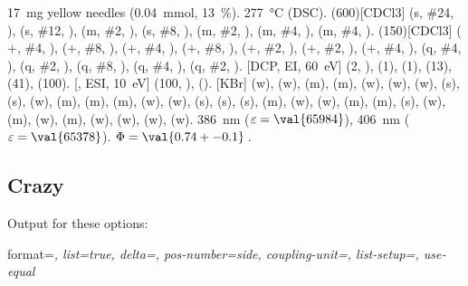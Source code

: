 \documentclass{chemmacros-manual}
\begin{document}
\begin{experimental}[format=\bfseries,delta=(ppm),list=true,use-equal]
   \SI{17}{\milli\gram} yellow needles (\SI{0.04}{\milli\mole},
  \SI{13}{\percent}).
   \SI{277}{\celsius} (DSC).
  \NMR(600)[CDCl3]  (s, \#{24}, ),  (s, \#{12},
  ),  (m, \#{2}, ),  (s, \#{8},
  ),  (m, \#{2}, ),  (m, \#{4},
  ),  (m, \#{4}, ).
  (150)[CDCl3]  ($+$, \#{4}, ),  ($+$,
  \#{8}, ),  ($+$, \#{4}, ),  ($+$, \#{8},
  ),  ($+$, \#{2}, ),  ($+$, \#{2},
  ),  ($+$, \#{4}, ),  (q, \#{4},
  ),  (q, \#{2}, ),  (q, \#{8}, ),
   (q, \#{4}, ),  (q, \#{2}, ).
  [DCP, EI, \SI{60}{\electronvolt}]  (2, ), 
  (1),  (1),  (13),  (41),  (100).
  [, ESI, \SI{10}{\electronvolt}]  (100,
  ),  ().
  [KBr]  (w),  (w),  (m), 
  (m),  (w),  (w),  (w),  (s),
   (s),  (w),  (m),  (m), 
  (m),  (w),  (w),  (s),  (s),
   (s),  (m),  (w),  (w), 
  (m),  (m),  (s),  (w),  (m), 
  (w),  (m),  (w),  (w),  (w), 
  (w).
   \SI{386}{\nano\metre} ($\varepsilon = \val{65984}$),
  \SI{406}{\nano\metre} ($\varepsilon = \val{65378}$).
   $\Phi = \val{0.74+-0.1}$\,.
\end{experimental}

\subsection{Crazy}
Output for these options:

\begin{sourcecode}
  format=\color{red}\itshape,
  list=true,
  delta=\textcolor{green}{},
  pos-number=side,
  coupling-unit=\mega\gram\per\square\second,
  list-setup=,
  use-equal
\end{sourcecode}
\end{document}
